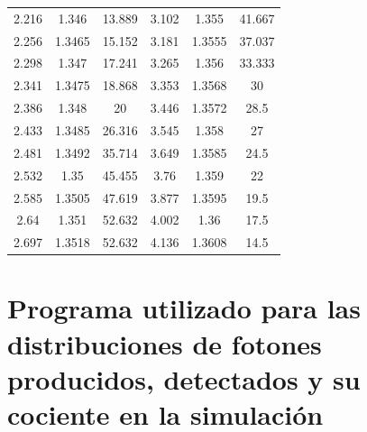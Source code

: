 \documentclass{book}
\begin{document}
\begin{table}[h]
\begin{tabular}{c c c | c c c}
2.216                     & 1.346                    & 13.889                    & 3.102                     & 1.355                    & 41.667                    \\
2.256                     & 1.3465                   & 15.152                    & 3.181                     & 1.3555                   & 37.037                    \\
2.298                     & 1.347                    & 17.241                    & 3.265                     & 1.356                    & 33.333                    \\
2.341                     & 1.3475                   & 18.868                    & 3.353                     & 1.3568                   & 30                        \\
2.386                     & 1.348                    & 20                        & 3.446                     & 1.3572                   & 28.5                      \\
2.433                     & 1.3485                   & 26.316                    & 3.545                     & 1.358                    & 27                        \\
2.481                     & 1.3492                   & 35.714                    & 3.649                     & 1.3585                   & 24.5                      \\
2.532                     & 1.35                     & 45.455                    & 3.76                      & 1.359                    & 22                        \\
2.585                     & 1.3505                   & 47.619                    & 3.877                     & 1.3595                   & 19.5                      \\
2.64                      & 1.351                    & 52.632                    & 4.002                     & 1.36                     & 17.5                      \\
2.697                     & 1.3518                   & 52.632                    & 4.136                     & 1.3608                   & 14.5 \\

 \hline
\hline

\hline
\end{tabular}
\end{table}

\pagebreak
\section{Programa utilizado para las distribuciones de fotones producidos, detectados y su cociente en la simulaci\'on}
\end{document}
